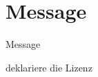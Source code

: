 
\section{Message}

\begin{frame}{Message}
	\pause
	\begin{center}
		\Huge
		deklariere die Lizenz
	\end{center}
\end{frame}
